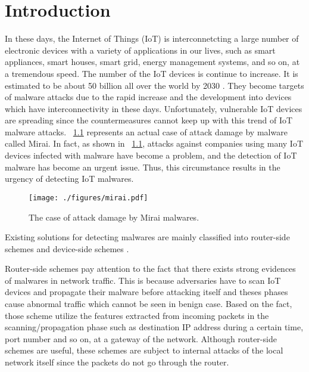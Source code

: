\chapter{Introduction}\label{Sec:Introduction}

In these days, the Internet of Things (IoT) is interconnetcting a large number of electronic devices with a variety of applications in our lives, such as smart appliances, smart houses, smart grid, energy management systems, and so on, at a tremendous speed.
The number of the IoT devices is continue to increase.
It is estimated to be about 50 billion all over the world by 2030 \cite{bg1, bg2}.
They become targets of malware attacks due to the rapid increase and the development into devices which have interconnectivity in these days.
Unfortunately, vulnerable IoT devices are spreading since the countermeasures cannot keep up with this trend of IoT malware attacks.
\figurename~\ref{fig:mirai} represents an actual case of attack damage by malware called Mirai.
In fact, as shown in \figurename~\ref{fig:mirai}, attacks against companies using many IoT devices infected with malware have become a problem, and the detection of IoT malware has become an urgent issue.
Thus, this circumstance results in the urgency of detecting IoT malwares.

\begin{figure}[t]
 \centering
 \texttt{[image: ./figures/mirai.pdf]}
 \caption{The case of attack damage by Mirai malwares.} 
 \label{fig:mirai}
\end{figure}
Existing solutions for detecting malwares are mainly classified into router-side schemes \cite{net} and device-side schemes \cite{cfg}.

Router-side schemes pay attention to the fact that there exists strong evidences of malwares in network traffic.
This is because adversaries have to scan IoT devices and propagate their malware before attacking itself and theses phases cause abnormal traffic which cannot be seen in benign case.
Based on the fact, those scheme utilize the features extracted from incoming packets in the scanning/propagation phase such as destination IP address during a certain time, port number and so on, at a gateway of the network.
Although router-side schemes are useful, these schemes are subject to internal attacks of the local network itself since the packets do not go through the router.

